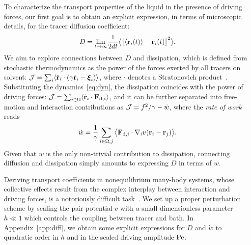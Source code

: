 \documentclass[superscriptaddress, twocolumn, prx, longbibliography, nofootinbib]{revtex4-1}
\begin{document}
To characterize the transport properties of the liquid in the presence of driving forces, our first goal is to obtain an explicit expression, in terms of microscopic details, for the tracer diffusion coefficient:
\begin{equation}
	D = \underset{t\to\infty}{\lim} \frac{1}{2dt} \big\langle \big[\langle{\bf r}_i(t)\rangle-{\bf r}_i(t)\big]^2 \big\rangle .
\end{equation}
We aim to explore connections between $D$ and dissipation, which is defined from stochastic thermodynamics as the power of the forces exerted by all tracers on solvent: ${\cal J} = \sum_i\langle\dot{\bf r}_i\cdot(\gamma\dot{\bf r}_i-{\boldsymbol\xi}_i)\rangle$, where $\cdot$ denotes a Stratonovich product~\cite{Sekimoto1998, Seifert2012}. Substituting the dynamics~\eqref{eq:dyn}, the dissipation coincides with the power of driving forces: ${\cal J} = \sum_{i\in\Omega}\langle\dot{\bf r}_i\cdot{\bf F}_{{\rm d},i}\rangle$, and it can be further separated into free-motion and interaction contributions as ${\cal J} = f^2/\gamma - \dot w$, where the {\it rate of work} reads
\begin{equation}\label{eq:work}
	\dot w = \frac{1}{\gamma} \sum_{i\in\Omega,j}\big\langle {\bf F}_{{\rm d},i}\cdot\nabla_iv({\bf r}_i-{\bf r}_j)\big\rangle.
\end{equation}
Given that $\dot w$ is the only non-trivial contribution to dissipation, connecting diffusion and dissipation simply amounts to expressing $D$ in terms of $\dot w$.


Deriving transport coefficients in nonequilibrium many-body systems, whose collective effects result from the complex interplay between interaction and driving forces, is a notoriously difficult task~\cite{Voituriez2016, Brady2017, Stenhammar2017, Tailleur2017, Illien2018}. We set up a proper perturbation scheme by scaling the pair potential $v$ with a small dimensionless parameter $h\ll1$ which controls the coupling between tracer and bath. In Appendix~\ref{app:diff}, we obtain some explicit expressions for $D$ and $\dot w$ to quadratic order in $h$ and in the scaled driving amplitude $\rm Pe$.
\end{document}
